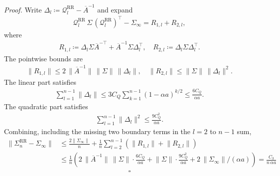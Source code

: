 \textit{Proof.} Write \(\Delta_l \coloneqq \mathcal{Q}_l^{\text{RR}} - \overline{A}^{-1}\) and expand
\begin{equation}
\begin{aligned}
\mathcal{Q}_l^{\text{RR}} \, \Sigma \, (\mathcal{Q}_l^{\text{RR}})^\top - \Sigma_\infty
  = R_{1,l} + R_{2,l},
\end{aligned}
\end{equation}
where
\begin{equation}
\begin{aligned}
R_{1,l}
  \coloneqq \Delta_l \Sigma \overline{A}^{-\top}
     + \overline{A}^{-1} \Sigma \Delta_l^\top,
\quad
R_{2,l} \coloneqq \Delta_l \Sigma \Delta_l^\top.
\end{aligned}
\end{equation}
The pointwise bounds are
\begin{equation}
\begin{aligned}
\lVert  R_{1, l}  \rVert \le 2 \, \lVert  \overline{A}^{-1}  \rVert \, \lVert  \Sigma  \rVert \, \lVert  \Delta_l  \rVert,
\quad
\lVert  R_{2, l}  \rVert \le \lVert  \Sigma  \rVert \, \lVert  \Delta_l  \rVert^2.
\end{aligned}
\end{equation}
The linear part satisfies
\begin{equation}
\begin{aligned}
\sum_{l = 1}^{n - 1} \lVert  \Delta_l  \rVert
  \le 3 C_Q \sum_{k = 1}^{n - 1} (1 - \alpha a)^{k / 2}
  \le \frac{6 C_Q}{\alpha a}.
\end{aligned}
\end{equation}
The quadratic part satisfies
\begin{equation}
\begin{aligned}
\sum_{l = 1}^{n - 1} \lVert  \Delta_l  \rVert^2 \le \frac{9 C_Q^2}{\alpha a}.
\end{aligned}
\end{equation}
Combining, including the missing two boundary terms in the \(l = 2\) to \(n - 1\)
sum,
\begin{equation}
\begin{aligned}
\lVert  \Sigma_n^{\text{RR}} - \Sigma_\infty  \rVert
  &\le \frac{2 \lVert  \Sigma_\infty  \rVert}{n}
      + \frac{1}{n} \sum_{l = 2}^{n - 1} (\lVert  R_{1, l}  \rVert + \lVert  R_{2, l}  \rVert) \\
  &\le \frac{1}{n} (2 \, \lVert  \overline{A}^{-1}  \rVert \, \lVert  \Sigma  \rVert \cdot \frac{6 C_Q}{\alpha a}
                + \lVert  \Sigma  \rVert \cdot \frac{9 C_Q^2}{\alpha a}
                + 2 \, \lVert  \Sigma_\infty  \rVert / (\alpha a))
  = \frac{C_3}{n \, \alpha a}
\end{aligned}
\end{equation}
\begin{equation}
\begin{aligned}
\square
\end{aligned}
\end{equation}
